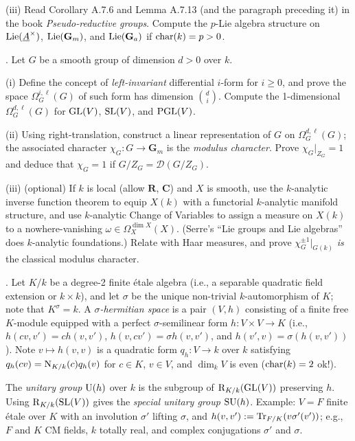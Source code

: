 \documentclass[10pt]{amsart}
\begin{document}
(iii) Read Corollary A.7.6 and Lemma A.7.13 (and the paragraph preceding it)
in the book {\em Pseudo-reductive groups}.  Compute the $p$-Lie algebra structure on
${\rm{Lie}}(\underline{A}^{\times})$, ${\rm{Lie}}(\mathbf{G}_m)$,
and ${\rm{Lie}}(\mathbf{G}_a)$ if ${\rm{char}}(k) = p > 0$. 

\medskip{}. Let $G$ be a smooth group of dimension $d > 0$ over $k$.

(i) Define the concept of {\em left-invariant} differential $i$-form for $i \ge 0$,
and prove the space $\Omega^{i,\ell}_G(G)$ of such form has dimension $d\choose{i}$.  
Compute the 1-dimensional $\Omega^{d,\ell}_G(G)$ for ${\rm{GL}}(V)$, ${\rm{SL}}(V)$, and
${\rm{PGL}}(V)$.

(ii)  Using right-translation, construct a linear representation of
$G$ on $\Omega^{d,\ell}_G(G)$;
the associated character $\chi_G:G \rightarrow \mathbf{G}_m$ 
is the {\em modulus
character}.  Prove $\chi_G|_{Z_G} = 1$ and deduce that $\chi_G = 1$ if $G/Z_G = 
\mathcal{D}(G/Z_G)$.

(iii) (optional) If $k$ is local (allow $\mathbf{R}$, $\mathbf{C}$) and $X$ is smooth, 
use the $k$-analytic inverse function theorem to equip $X(k)$ with a functorial
$k$-analytic manifold structure, and use $k$-analytic
Change of Variables to assign a measure on $X(k)$ to a nowhere-vanishing 
$\omega \in \Omega^{\dim X}_X(X)$.  (Serre's ``Lie groups and Lie algebras''
does $k$-analytic foundations.) Relate with Haar measures, and prove
$\chi_G^{\pm 1}|_{G(k)}$ {\em is} the classical modulus character.

\medskip{}.  Let $K/k$ be a degree-2 finite \'etale algebra (i.e., a separable quadratic field extension or
$k \times k$), and let $\sigma$ be the unique non-trivial $k$-automorphism of $K$; note that
$K^{\sigma} = k$.
A {\em $\sigma$-hermitian space} is a pair $(V,h)$ consisting of a finite free $K$-module
equipped with a perfect $\sigma$-semilinear form $h:V \times V \rightarrow K$
(i.e., $h(cv,v') = c h(v,v')$, $h(v,cv') = \sigma h(v,v')$, and $h(v',v) = \sigma(h(v,v'))$). 
Note $v \mapsto h(v,v)$ is a quadratic form $q_h:V \rightarrow k$ over $k$ satisfying
$q_h(cv) = {\rm{N}}_{K/k}(c) q_h(v)$ for $c \in K$, $v \in V$, and $\dim_k V$ is even
(${\rm{char}}(k) = 2$ ok!). 

The {\em unitary group} ${\rm{U}}(h)$ over $k$  is the subgroup of
${\rm{R}}_{K/k}({\rm{GL}}(V))$ preserving $h$. 
Using ${\rm{R}}_{K/k}({\rm{SL}}(V))$ gives the {\em special unitary group}
${\rm{SU}}(h)$.  Example: $V = F$ finite \'etale over $K$ 
with an involution $\sigma'$ lifting $\sigma$, 
and $h(v,v') := {\rm{Tr}}_{F/K}(v\sigma'(v'))$; e.g., $F$ and $K$ CM fields, $k$ totally real,
and complex conjugations $\sigma'$ and $\sigma$.
\end{document}
